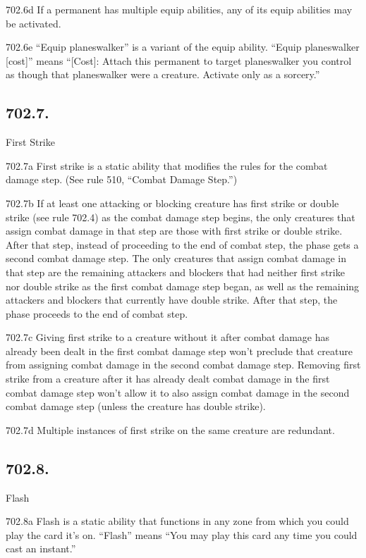 702.6d If a permanent has multiple equip abilities, any of its equip abilities may be activated.

702.6e “Equip planeswalker” is a variant of the equip ability. “Equip planeswalker [cost]” means “[Cost]: Attach this permanent to target planeswalker you control as though that planeswalker were a creature. Activate only as a sorcery.”

\subsection*{702.7.}
First Strike

702.7a First strike is a static ability that modifies the rules for the combat damage step. (See rule 510, “Combat Damage Step.”)

702.7b If at least one attacking or blocking creature has first strike or double strike (see rule 702.4) as the combat damage step begins, the only creatures that assign combat damage in that step are those with first strike or double strike. After that step, instead of proceeding to the end of combat step, the phase gets a second combat damage step. The only creatures that assign combat damage in that step are the remaining attackers and blockers that had neither first strike nor double strike as the first combat damage step began, as well as the remaining attackers and blockers that currently have double strike. After that step, the phase proceeds to the end of combat step.

702.7c Giving first strike to a creature without it after combat damage has already been dealt in the first combat damage step won’t preclude that creature from assigning combat damage in the second combat damage step. Removing first strike from a creature after it has already dealt combat damage in the first combat damage step won’t allow it to also assign combat damage in the second combat damage step (unless the creature has double strike).

702.7d Multiple instances of first strike on the same creature are redundant.

\subsection*{702.8.}
Flash

702.8a Flash is a static ability that functions in any zone from which you could play the card it’s on. “Flash” means “You may play this card any time you could cast an instant.”

